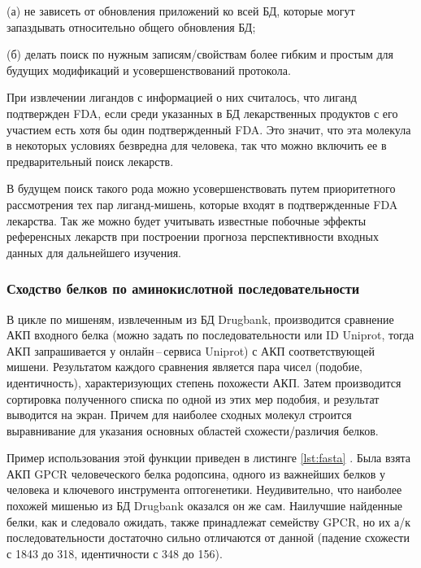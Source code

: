 \documentclass[a4paper,14pt]{article}         %
\begin{document}
(а) не зависеть от обновления приложений ко всей БД, которые могут запаздывать относительно общего обновления БД; 

(б) делать поиск по нужным записям/свойствам более гибким и простым для будущих модификаций и усовершенствований протокола.

При извлечении лигандов с информацией о них считалось, что лиганд подтвержден FDA, если среди указанных в БД лекарственных продуктов с его участием есть хотя бы один подтвержденный FDA. Это значит, что эта молекула в некоторых условиях безвредна для человека, так что можно включить ее в предварительный поиск лекарств. 

В будущем поиск такого рода можно усовершенствовать путем приоритетного рассмотрения тех пар лиганд-мишень, которые входят в подтвержденные FDA лекарства. Так же можно будет учитывать известные побочные эффекты референсных лекарств при построении прогноза перспективности входных данных для дальнейшего изучения.

\subsubsection{Сходство белков по аминокислотной последовательности}

В цикле по мишеням, извлеченным из БД Drugbank, производится сравнение АКП входного белка (можно задать по последовательности или ID Uniprot, тогда АКП запрашивается у онлайн\,--\,сервиса Uniprot) с АКП соответствующей мишени. Результатом каждого сравнения является пара чисел (подобие, идентичность), характеризующих степень похожести АКП. Затем производится сортировка полученного списка по одной из этих мер подобия, и результат выводится на экран. Причем для наиболее сходных молекул строится выравнивание для указания основных областей схожести/различия белков.

Пример использования этой функции приведен в листинге \ref{lst:fasta}
\color{black}. Была взята АКП GPCR человеческого белка родопсина, одного из важнейших белков у человека и ключевого инструмента оптогенетики. Неудивительно, что наиболее похожей мишенью из БД Drugbank оказался он же сам. Наилучшие найденные белки, как и следовало ожидать, также принадлежат семейству GPCR, но их а/к последовательности достаточно сильно отличаются от данной (падение схожести с 1843 до 318, идентичности с 348 до 156). 
\end{document}
